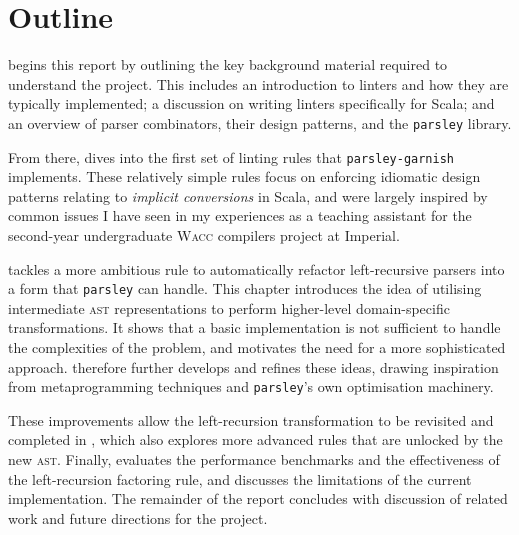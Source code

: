 \documentclass[../../main.tex]{subfiles}
\begin{document}
\section*{Outline}
 begins this report by outlining the key background material required to understand the project.
This includes an introduction to linters and how they are typically implemented; a discussion on writing linters specifically for Scala; and an overview of parser combinators, their design patterns, and the \texttt{parsley} library.

From there,  dives into the first set of linting rules that \texttt{parsley-garnish} implements.
These relatively simple rules focus on enforcing idiomatic design patterns relating to \emph{implicit conversions} in Scala, and were largely inspired by common issues I have seen in my experiences as a teaching assistant for the second-year undergraduate \textsc{Wacc} compilers project at Imperial.

 tackles a more ambitious rule to automatically refactor left-recursive parsers into a form that \texttt{parsley} can handle.
This chapter introduces the idea of utilising intermediate \textsc{ast} representations to perform higher-level domain-specific transformations.
It shows that a basic implementation is not sufficient to handle the complexities of the problem, and motivates the need for a more sophisticated approach.
 therefore further develops and refines these ideas, drawing inspiration from metaprogramming techniques and \texttt{parsley}'s own optimisation machinery.

These improvements allow the left-recursion transformation to be revisited and completed in , which also explores more advanced rules that are unlocked by the new \textsc{ast}.
Finally,  evaluates the performance benchmarks and the effectiveness of the left-recursion factoring rule, and discusses the limitations of the current implementation.
The remainder of the report concludes with discussion of related work and future directions for the project.
\end{document}
